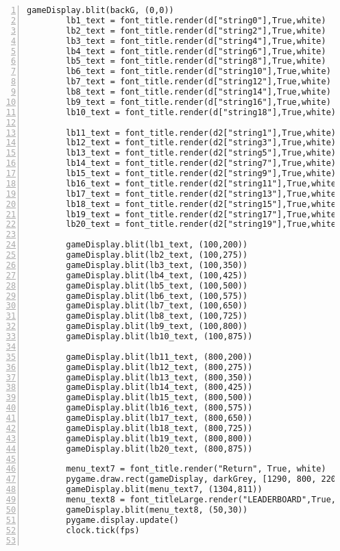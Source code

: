\documentclass[12pt]{report}
\begin{document}
\begin{Verbatim}[numbers=left, frame=single]
        gameDisplay.blit(backG, (0,0))
        lb1_text = font_title.render(d["string0"],True,white)
        lb2_text = font_title.render(d["string2"],True,white)
        lb3_text = font_title.render(d["string4"],True,white)
        lb4_text = font_title.render(d["string6"],True,white)
        lb5_text = font_title.render(d["string8"],True,white)
        lb6_text = font_title.render(d["string10"],True,white)
        lb7_text = font_title.render(d["string12"],True,white)
        lb8_text = font_title.render(d["string14"],True,white)
        lb9_text = font_title.render(d["string16"],True,white)
        lb10_text = font_title.render(d["string18"],True,white)

        lb11_text = font_title.render(d2["string1"],True,white)
        lb12_text = font_title.render(d2["string3"],True,white)
        lb13_text = font_title.render(d2["string5"],True,white)
        lb14_text = font_title.render(d2["string7"],True,white)
        lb15_text = font_title.render(d2["string9"],True,white)
        lb16_text = font_title.render(d2["string11"],True,white)
        lb17_text = font_title.render(d2["string13"],True,white)
        lb18_text = font_title.render(d2["string15"],True,white)
        lb19_text = font_title.render(d2["string17"],True,white)
        lb20_text = font_title.render(d2["string19"],True,white)

        gameDisplay.blit(lb1_text, (100,200))
        gameDisplay.blit(lb2_text, (100,275))
        gameDisplay.blit(lb3_text, (100,350))
        gameDisplay.blit(lb4_text, (100,425))
        gameDisplay.blit(lb5_text, (100,500))
        gameDisplay.blit(lb6_text, (100,575))
        gameDisplay.blit(lb7_text, (100,650))
        gameDisplay.blit(lb8_text, (100,725))
        gameDisplay.blit(lb9_text, (100,800))
        gameDisplay.blit(lb10_text, (100,875))

        gameDisplay.blit(lb11_text, (800,200))
        gameDisplay.blit(lb12_text, (800,275))
        gameDisplay.blit(lb13_text, (800,350))
        gameDisplay.blit(lb14_text, (800,425))
        gameDisplay.blit(lb15_text, (800,500))
        gameDisplay.blit(lb16_text, (800,575))
        gameDisplay.blit(lb17_text, (800,650))
        gameDisplay.blit(lb18_text, (800,725))
        gameDisplay.blit(lb19_text, (800,800))
        gameDisplay.blit(lb20_text, (800,875))
    
        menu_text7 = font_title.render("Return", True, white)
        pygame.draw.rect(gameDisplay, darkGrey, [1290, 800, 220 , 60])
        gameDisplay.blit(menu_text7, (1304,811))
        menu_text8 = font_titleLarge.render("LEADERBOARD",True,white)
        gameDisplay.blit(menu_text8, (50,30))
        pygame.display.update()                                                                 
        clock.tick(fps)


\end{Verbatim}
\end{document}
